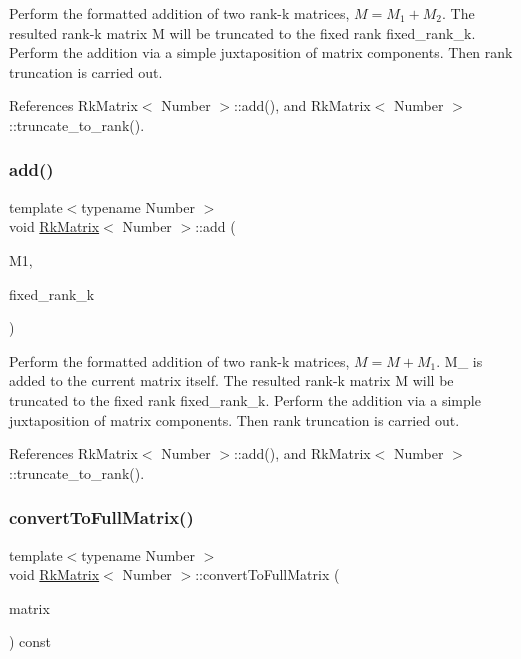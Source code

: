 Perform the formatted addition of two rank-\/k matrices, $M = M_1 + M_2$. The resulted rank-\/k matrix {\ttfamily M} will be truncated to the fixed rank {\ttfamily fixed\+\_\+rank\+\_\+k}. Perform the addition via a simple juxtaposition of matrix components. Then rank truncation is carried out.

References Rk\+Matrix$<$ Number $>$\+::add(), and Rk\+Matrix$<$ Number $>$\+::truncate\+\_\+to\+\_\+rank().

\mbox{\label{classRkMatrix_a1f51eac54ddb43c0670a72da62bc1e55}} 
\subsubsection{\texorpdfstring{add()}{add()}\hspace{0.1cm}{\footnotesize\ttfamily [4/4]}}
{\footnotesize\ttfamily template$<$typename Number $>$ \\
void \hyperlink{classRkMatrix}{Rk\+Matrix}$<$ Number $>$\+::add (\begin{DoxyParamCaption}\item[{const \hyperlink{classRkMatrix}{Rk\+Matrix}$<$ Number $>$ \&}]{M1,  }\item[{const \hyperlink{classRkMatrix_add060bfc3a4cc77f858c3d6dd58cadd5}{size\+\_\+type}}]{fixed\+\_\+rank\+\_\+k }\end{DoxyParamCaption})}

Perform the formatted addition of two rank-\/k matrices, $M = M + M_1$. {\ttfamily M\+\_} is added to the current matrix itself. The resulted rank-\/k matrix {\ttfamily M} will be truncated to the fixed rank {\ttfamily fixed\+\_\+rank\+\_\+k}. Perform the addition via a simple juxtaposition of matrix components. Then rank truncation is carried out.

References Rk\+Matrix$<$ Number $>$\+::add(), and Rk\+Matrix$<$ Number $>$\+::truncate\+\_\+to\+\_\+rank().

\mbox{\label{classRkMatrix_a384cdf3033d98f90b80d373add20b556}} 
\subsubsection{\texorpdfstring{convert\+To\+Full\+Matrix()}{convertToFullMatrix()}}
{\footnotesize\ttfamily template$<$typename Number $>$ \\
void \hyperlink{classRkMatrix}{Rk\+Matrix}$<$ Number $>$\+::convert\+To\+Full\+Matrix (\begin{DoxyParamCaption}\item[{\hyperlink{classLAPACKFullMatrixExt}{L\+A\+P\+A\+C\+K\+Full\+Matrix\+Ext}$<$ Number $>$ \&}]{matrix }\end{DoxyParamCaption}) const}

